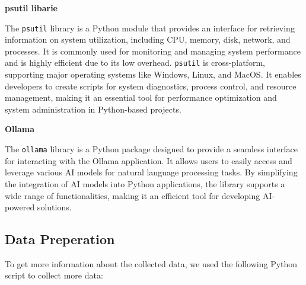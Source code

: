 \textbf{psutil libarie}

The \texttt{psutil} library is a Python module that provides an interface for retrieving information on system utilization, 
including CPU, memory, disk, network, and processes. It is commonly used for monitoring and managing system performance and is 
highly efficient due to its low overhead. \texttt{psutil} is cross-platform, supporting major operating systems like Windows, 
Linux, and MacOS. It enables developers to create scripts for system diagnostics, process control, and resource management, 
making it an essential tool for performance optimization and system administration in Python-based projects.

\cite{psutil-library-explanation}

\textbf{Ollama}

The \texttt{ollama} library is a Python package designed to provide a seamless interface for interacting with the Ollama application. 
It allows users to easily access and leverage various AI models for natural language processing tasks. 
By simplifying the integration of AI models into Python applications, the library supports a wide range of functionalities, 
making it an efficient tool for developing AI-powered solutions.

\cite{ollama-python-documentation-github}


\subsection{Data Preperation}

To get more information about the collected data, we used the following Python script to collect more data:

